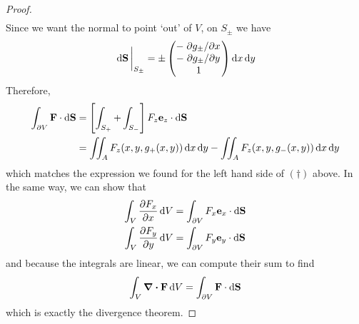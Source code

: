 \documentclass{article}
\begin{document}
\begin{proof}
\begin{align*}
    \end{align*}
    Since we want the normal to point `out' of $V$, on $S_\pm$ we have
    \[ \eval{\dd{\vb S}}_{S_\pm} = \pm \begin{pmatrix}
            -\pdv*{g_\pm}{x} \\
            -\pdv*{g_\pm}{y} \\
            1                \\
        \end{pmatrix} \dd{x}\dd{y} \]
    Therefore,
    \begin{align*}
        \int_{\partial V} \vb F \cdot \dd{\vb S} & = \left[ \int_{S_+} + \int_{S_-} \right] F_z \vb e_z \cdot \dd{\vb S}                   \\
                                                 & = \iint_A F_z(x, y, g_+(x, y)) \dd{x}\dd{y} - \iint_A F_z(x, y, g_-(x, y)) \dd{x}\dd{y}
    \end{align*}
    which matches the expression we found for the left hand side of $(\dagger)$ above. In the same way, we can show that
    \begin{align*}
        \int_V \pdv{F_x}{x} \dd{V} & = \int_{\partial V} F_x \vb e_x \cdot \dd{\vb S} \\
        \int_V \pdv{F_y}{y} \dd{V} & = \int_{\partial V} F_y \vb e_y \cdot \dd{\vb S} \\
    \end{align*}
    and because the integrals are linear, we can compute their sum to find
    \[ \int_V \div{\vb F} \dd{V} = \int_{\partial V} \vb F \cdot \dd{\vb S} \]
    which is exactly the divergence theorem.
\end{proof}
\end{document}
